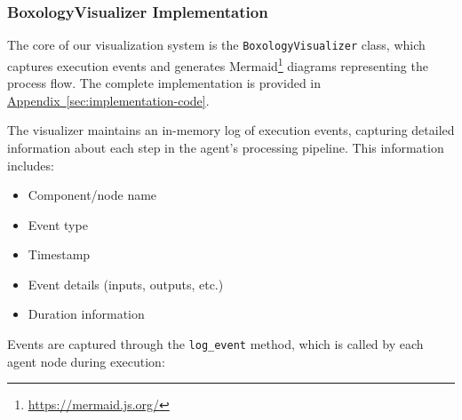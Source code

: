 \subsubsection{BoxologyVisualizer Implementation}
The core of our visualization system is the \texttt{BoxologyVisualizer} class, which captures execution events and generates Mermaid\footnote{\url{https://mermaid.js.org/}} diagrams representing the process flow. The complete implementation is provided in \hyperref[code:boxology-visualizer]{Appendix~\ref{sec:implementation-code}}.

The visualizer maintains an in-memory log of execution events, capturing detailed information about each step in the agent's processing pipeline. This information includes:

\begin{itemize}
    \item Component/node name
    \item Event type
    \item Timestamp
    \item Event details (inputs, outputs, etc.)
    \item Duration information
\end{itemize}

Events are captured through the \texttt{log\_event} method, which is called by each agent node during execution:

